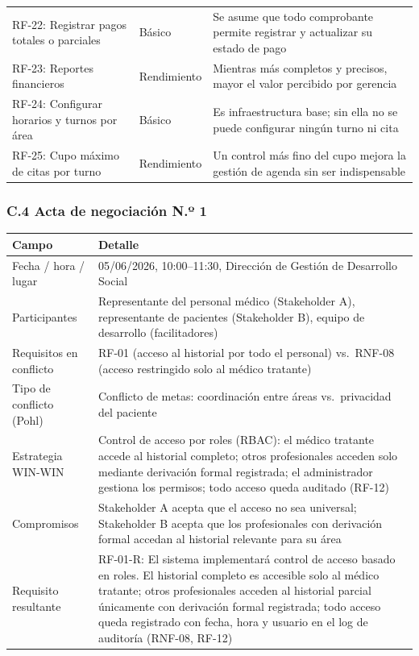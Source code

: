 \documentclass[11pt,a4paper]{article}
\begin{document}
\begin{longtable}{p{} p{} p{}}
		RF-22: Registrar pagos totales o parciales & Básico & Se asume que todo comprobante permite registrar y actualizar su estado de pago \\
		RF-23: Reportes financieros & Rendimiento & Mientras más completos y precisos, mayor el valor percibido por gerencia \\
		RF-24: Configurar horarios y turnos por área & Básico & Es infraestructura base; sin ella no se puede configurar ningún turno ni cita \\
		RF-25: Cupo máximo de citas por turno & Rendimiento & Un control más fino del cupo mejora la gestión de agenda sin ser indispensable \\
	\end{longtable}
	
	\subsubsection{C.4 Acta de negociación N.º 1}
	
	\begin{longtable}{p{} p{} }
		
		
		\toprule
		\textbf{Campo} &
		\textbf{Detalle}  \\
		\midrule
		\endhead
		
		Fecha / hora / lugar & 05/06/2026, 10:00--11:30, Dirección de Gestión de Desarrollo Social \\
		Participantes & Representante del personal médico (Stakeholder A), representante de pacientes (Stakeholder B), equipo de desarrollo (facilitadores) \\
		Requisitos en conflicto & RF-01 (acceso al historial por todo el personal) vs.~RNF-08 (acceso restringido solo al médico tratante) \\
		Tipo de conflicto (Pohl) & Conflicto de metas: coordinación entre áreas vs.~privacidad del paciente \\
		Estrategia WIN-WIN & Control de acceso por roles (RBAC): el médico tratante accede al historial completo; otros profesionales acceden solo mediante derivación formal registrada; el administrador gestiona los permisos; todo acceso queda auditado (RF-12) \\
		Compromisos & Stakeholder A acepta que el acceso no sea universal; Stakeholder B acepta que los profesionales con derivación formal accedan al historial relevante para su área \\
		Requisito resultante & RF-01-R: El sistema implementará control de acceso basado en roles. El historial completo es accesible solo al médico tratante; otros profesionales acceden al historial parcial únicamente con derivación formal registrada; todo acceso queda registrado con fecha, hora y usuario en el log de auditoría (RNF-08, RF-12) \\
		\bottomrule
	\end{longtable}
	
\end{document}
